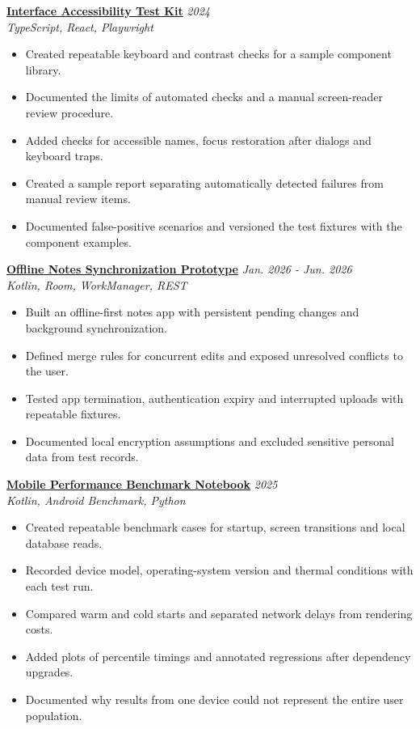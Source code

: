\documentclass[11pt,a4paper]{article}
\begin{document}
\textbf{\href{https://example.com/demos/accessibility-kit}{Interface Accessibility Test Kit}} \hfill \textit{2024}\\
\textit{TypeScript, React, Playwright}
\begin{itemize}[leftmargin=*,noitemsep,topsep=2pt]
\item Created repeatable keyboard and contrast checks for a sample component library.
\item Documented the limits of automated checks and a manual screen-reader review procedure.
\item Added checks for accessible names, focus restoration after dialogs and keyboard traps.
\item Created a sample report separating automatically detected failures from manual review items.
\item Documented false-positive scenarios and versioned the test fixtures with the component examples.
\end{itemize}

\textbf{\href{https://example.com/demos/offline-notes}{Offline Notes Synchronization Prototype}} \hfill \textit{Jan. 2026 - Jun. 2026}\\
\textit{Kotlin, Room, WorkManager, REST}
\begin{itemize}[leftmargin=*,noitemsep,topsep=2pt]
\item Built an offline-first notes app with persistent pending changes and background synchronization.
\item Defined merge rules for concurrent edits and exposed unresolved conflicts to the user.
\item Tested app termination, authentication expiry and interrupted uploads with repeatable fixtures.
\item Documented local encryption assumptions and excluded sensitive personal data from test records.
\end{itemize}

\textbf{\href{https://example.com/demos/mobile-performance-benchmark-notebook}{Mobile Performance Benchmark Notebook}} \hfill \textit{2025}\\
\textit{Kotlin, Android Benchmark, Python}
\begin{itemize}[leftmargin=*,noitemsep,topsep=2pt]
\item Created repeatable benchmark cases for startup, screen transitions and local database reads.
\item Recorded device model, operating-system version and thermal conditions with each test run.
\item Compared warm and cold starts and separated network delays from rendering costs.
\item Added plots of percentile timings and annotated regressions after dependency upgrades.
\item Documented why results from one device could not represent the entire user population.
\end{itemize}
\end{document}

